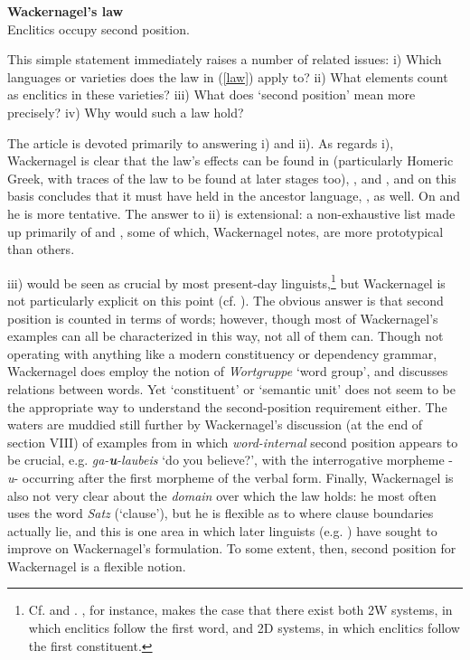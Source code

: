 \begin{exe}
\ex\label{law} \textbf{Wackernagel's law}\\
Enclitics occupy second position.
\end{exe}

This simple statement immediately raises a number of related issues: i) Which languages or varieties does the law in (\ref{law}) apply to? ii) What elements count as enclitics in these varieties? iii) What does `second position' mean more precisely? iv) Why would such a law hold?

The article is devoted primarily to answering i) and ii). As regards i), Wackernagel is clear that the law's effects can be found in  (particularly Homeric Greek, with traces of the law to be found at later stages too), , and , and on this basis concludes that it must have held in the ancestor language, , as well. On  and  he is more tentative. The answer to ii) is extensional: a non-exhaustive list made up primarily of  and , some of which, Wackernagel notes, are more prototypical than others.

iii) would be seen as crucial by most present-day linguists,\footnote{Cf. \citet[18--20]{Zwicky1977} and \citet[72--73]{Anderson1993}. \citet{Halpern1995}, for instance, makes the case that there exist both 2W systems, in which enclitics follow the first word, and 2D systems, in which enclitics follow the first constituent.} but Wackernagel is not particularly explicit on this point (cf. \citealp[11]{AzizHanna2015}). The obvious answer is that second position is counted in terms of words; however, though most of Wackernagel's examples can all be characterized in this way, not all of them can. Though not operating with anything like a modern constituency or dependency grammar, Wackernagel does employ the notion of \textit{Wortgruppe} `word group', and discusses relations between words. Yet `constituent' or `semantic unit' does not seem to be the appropriate way to understand the second-position requirement either. The waters are muddied still further by Wackernagel's discussion (at the end of section VIII) of examples from  in which \textit{word-internal} second position appears to be crucial, e.g.  \textit{ga-\textbf{u}-laubeis} `do you believe?', with the interrogative morpheme -\textit{u}- occurring after the first morpheme of the verbal form. Finally, Wackernagel is also not very clear about the \emph{domain} over which the law holds: he most often uses the word \emph{Satz} (`clause'), but he is flexible as to where clause boundaries actually lie, and this is one area in which later linguists (e.g. \citealp{Fraenkel1932,Fraenkel1933,Fraenkel1965,Ruijgh1990}) have sought to improve on Wackernagel's formulation. To some extent, then, second position for Wackernagel is a flexible notion.


